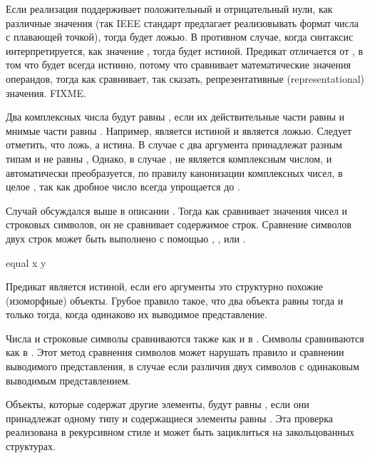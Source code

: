 \begin{defun}[Функция]
Если реализация поддерживает положительный и отрицательный нули, как различные
значения (так IEEE стандарт предлагает реализовывать формат числа с плавающей
точкой), тогда  будет ложью. В противном случае, когда
синтаксис  интерпретируется, как значение , тогда  будет истиной. Предикат \cdf{=} отличается от , в том что
 будет всегда истинно, потому что \cdf{=} сравнивает
математические значения операндов, тогда как  сравнивает, так сказать,
репрезентативные (representational) значения. FIXME.

Два комплексных числа будут равны , если их действительные части равны
 и мнимые части равны .
Например,  является истиной и
 является ложью.
Следует отметить, что  ложь,
а  истина.
В случае с 
два аргумента принадлежат разным типам и не равны ,
Однако, в случае ,
 не является комплексным числом, и автоматически преобразуется, по
правилу канонизации комплексных чисел, в целое , так как дробное число
 всегда упрощается до .

Случай  обсуждался выше в описании . Тогда как
 сравнивает значения чисел и строковых символов, он не сравнивает
содержимое строк. Сравнение символов двух строк может быть выполнено с помощью
, ,  или .

\begin{defun}[Функция]
equal x y

Предикат  является истиной, если его аргументы это структурно похожие
(изоморфные) объекты. Грубое правило такое, что два объекта равны 
тогда и только тогда, когда одинаково их выводимое представление.

Числа и строковые символы сравниваются также как и в .
Символы сравниваются как в . Этот метод сравнения символов может
нарушать правило и сравнении выводимого представления, в случае если различия
двух символов с одинаковым выводимым представлением.

Объекты, которые содержат другие элементы, будут равны , если они
принадлежат одному типу и содержащиеся элементы равны .
Эта проверка реализована в рекурсивном стиле и может быть зациклиться на
закольцованных структурах.


\end{defun}
\end{defun}

